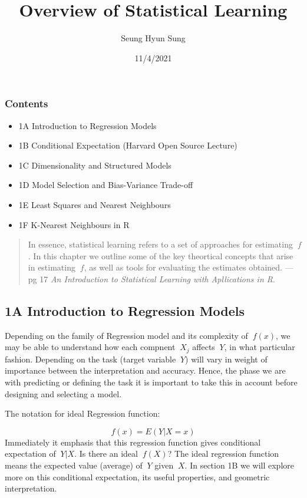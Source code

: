 \documentclass[
]{article}
\title{Overview of Statistical Learning}
\author{Seung Hyun Sung}
\date{11/4/2021}
\providecommand{\tightlist}{%
  \setlength{\itemsep}{0pt}\setlength{\parskip}{0pt}}
\begin{document}
\maketitle

\hypertarget{contents}{%
\subsubsection{Contents}\label{contents}}

\begin{itemize}
\tightlist
\item
  1A Introduction to Regression Models
\item
  1B Conditional Expectation (Harvard Open Source Lecture)
\item
  1C Dimensionality and Structured Models
\item
  1D Model Selection and Bias-Variance Trade-off
\item
  1E Least Squares and Nearest Neighbours
\item
  1F K-Nearest Neighbours in R
\end{itemize}

\begin{quote}
In essence, statistical learning refers to a set of approaches for
estimating \(\ f\). In this chapter we outline some of the key
theortical concepts that arise in estimating \(\ f\), as well as tools
for evaluating the estimates obtained. --- pg 17 \emph{An Introduction
to Statistical Learning with Apllications in R}.
\end{quote}

\hypertarget{a-introduction-to-regression-models}{%
\subsection{1A Introduction to Regression
Models}\label{a-introduction-to-regression-models}}

Depending on the family of Regression model and its complexity of
\(\ f(x)\), we may be able to understand how each compnent \(\ X_j\)
affects \(\ Y\), in what particular fashion. Depending on the task
(target variable \(\ Y\)) will vary in weight of importance between the
interpretation and accuracy. Hence, the phase we are with predicting or
defining the task it is important to take this in account before
designing and selecting a model.

The notation for ideal Regression function:

\[ f(x) = E(Y|X = x) \] Immediately it emphasis that this regression
function gives conditional expectation of \(\ Y|X\). Is there an ideal
\(\ f(X)\)? The ideal regression function means the expected value
(average) of \(\ Y\) given \(\ X\). In section 1B we will explore more
on this conditional expectation, its useful properties, and geometric
interpretation.
\end{document}
